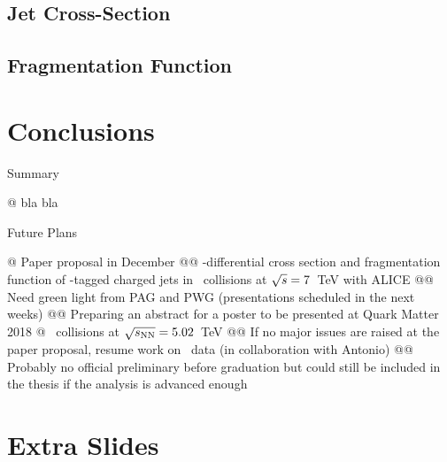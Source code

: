 \documentclass[xcolor={usenames,dvipsnames}]{beamer}
\begin{document}
\subsection{Jet Cross-Section}

\subsection{Fragmentation Function}

\section{Conclusions}

\begin{frame}[fragile]{Summary}
\begin{easylist}[itemize]
@ bla bla
\end{easylist}
\end{frame}

\begin{frame}[fragile]{Future Plans}
\small
\begin{easylist}
@ Paper proposal in December
@@ \pt-differential cross section and fragmentation function of \Dzero-tagged charged jets in \pp\ collisions at $\sqrt{s}=7$~TeV with ALICE
@@ Need green light from PAG and PWG (presentations scheduled in the next weeks)
@@ Preparing an abstract for a poster to be presented at Quark Matter 2018
@ \PbPb\ collisions at $\sqrt{s_{\rm NN}}=5.02$~TeV
@@ If no major issues are raised at the paper proposal, resume work on \PbPb\ data (in collaboration with Antonio)
@@ Probably no official preliminary before graduation but could still be included in the thesis if the analysis is advanced enough
\end{easylist}
\end{frame}

\section*{Extra Slides}
\end{document}
